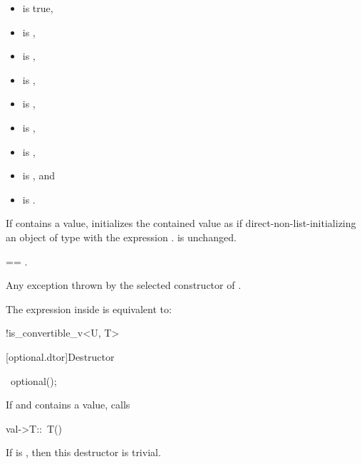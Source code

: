 \begin{itemdescr}
\pnum
\constraints
\begin{itemize}
\item {} is true,
\item {} is ,
\item {} is ,
\item {} is ,
\item {} is ,
\item {} is ,
\item {} is ,
\item {} is , and
\item {} is .
\end{itemize}

\pnum
\effects
If  contains a value,
initializes the contained value as if direct-non-list-initializing
an object of type  with the expression .
 is unchanged.

\pnum
\ensures
{} == .

\pnum
\throws
Any exception thrown by the selected constructor of .

\pnum
\remarks
The expression inside  is equivalent to:
\begin{codeblock}
!is_convertible_v<U, T>
\end{codeblock}
\end{itemdescr}

[optional.dtor]{Destructor}

%
\begin{itemdecl}
~optional();
\end{itemdecl}

\begin{itemdescr}
\pnum
\effects
If  and  contains a value, calls
\begin{codeblock}
val->T::~T()
\end{codeblock}

\pnum
\remarks
If  is , then this destructor is trivial.
\end{itemdescr}

